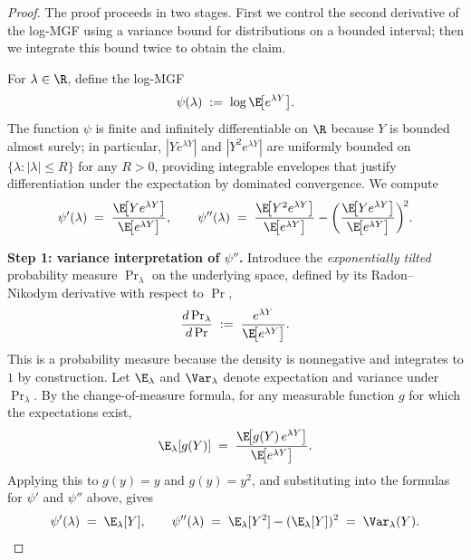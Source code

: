 \begin{proof}
The proof proceeds in two stages. First we control the second derivative of the
log-MGF using a variance bound for distributions on a bounded interval; then we
integrate this bound twice to obtain the claim.

For $\lambda \in \R$, define the log-MGF
\begin{align*}
\psi(\lambda) \;:=\; \log \E\!\bigl[e^{\lambda Y}\bigr].
\end{align*}
The function $\psi$ is finite and infinitely differentiable on $\R$ because $Y$ is
bounded almost surely; in particular, $|Y e^{\lambda Y}|$ and $|Y^2 e^{\lambda Y}|$
are uniformly bounded on $\{\lambda : |\lambda| \le R\}$ for any $R > 0$, providing
integrable envelopes that justify differentiation under the expectation by
dominated convergence. We compute
\begin{align*}
\psi'(\lambda) \;=\; \frac{\E\!\bigl[Y e^{\lambda Y}\bigr]}{\E\!\bigl[e^{\lambda Y}\bigr]},
\qquad
\psi''(\lambda) \;=\; \frac{\E\!\bigl[Y^2 e^{\lambda Y}\bigr]}{\E\!\bigl[e^{\lambda Y}\bigr]}
                    - \biggl(\frac{\E\!\bigl[Y e^{\lambda Y}\bigr]}{\E\!\bigl[e^{\lambda Y}\bigr]}\biggr)^{\!2}.
\end{align*}

\smallskip\noindent\textbf{Step 1: variance interpretation of $\psi''$.}
Introduce the \emph{exponentially tilted} probability measure $\Pr_\lambda$ on the
underlying space, defined by its Radon--Nikodym derivative with respect to $\Pr$,
\begin{align*}
\frac{d\Pr_\lambda}{d\Pr} \;:=\; \frac{e^{\lambda Y}}{\E\!\bigl[e^{\lambda Y}\bigr]}.
\end{align*}
This is a probability measure because the density is nonnegative and integrates to
$1$ by construction. Let $\E_\lambda$ and $\Var_\lambda$ denote expectation and
variance under $\Pr_\lambda$. By the change-of-measure formula, for any measurable
function $g$ for which the expectations exist,
\begin{align*}
\E_\lambda[g(Y)] \;=\; \frac{\E\!\bigl[g(Y)\, e^{\lambda Y}\bigr]}{\E\!\bigl[e^{\lambda Y}\bigr]}.
\end{align*}
Applying this to $g(y) = y$ and $g(y) = y^2$, and substituting into the formulas for
$\psi'$ and $\psi''$ above, gives
\begin{align*}
\psi'(\lambda) \;=\; \E_\lambda[Y],
\qquad
\psi''(\lambda) \;=\; \E_\lambda[Y^2] - (\E_\lambda[Y])^2 \;=\; \Var_\lambda(Y).
\end{align*}


\end{proof}
